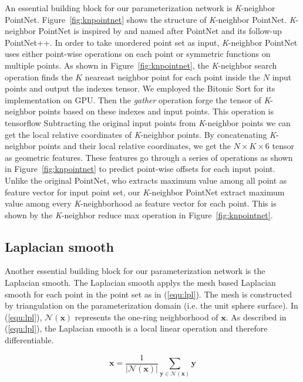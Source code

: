 An essential building block for our parameterization network is \textit{K}-neighbor PointNet. Figure~\ref{fig:knpointnet} shows the structure of \textit{K}-neighbor PointNet. \textit{K}-neighbor PointNet is inspired by and named after PointNet\citep{PointNet} and its follow-up PointNet++\citep{NIPS2017_7095}. In order to take unordered point set as input, \textit{K}-neighbor PointNet uses either point-wise operations on each point or symmetric functions on multiple points. As shown in Figure~\ref{fig:knpointnet}, the \textit{K}-neighbor search operation finds the $K$ neareast neighbor point for each point inside the $N$ input points and output the indexes tensor. We employed the Bitonic Sort\citep{bitonicsorter} for its implementation on GPU. Then the  \emph{gather} operation forge the tensor of \textit{K}-neighbor points based on these indexes and input points. This operation is tensorflow  Subtracting the original input points from \textit{K}-neighbor points we can get the local relative coordinates of \textit{K}-neighbor points. By concatenating \textit{K}-neighbor points and their local relative coordinates, we get the $N\times K\times6$ tensor as geometric features. These features go through a series of operations as shown in Figure~\ref{fig:knpointnet} to predict point-wise offsets for each input point. Unlike the original PointNet\citep{PointNet}, who extracts maximum value among all point as feature vector for input point set, our \textit{K}-neighbor PointNet extract maximum value among every \textit{K}-neighborhood as feature vector for each point. This is shown by the \textit{K}-neighbor reduce max operation in Figure~\ref{fig:knpointnet}.

\subsection{Laplacian smooth}
Another essential building block for our parameterization network is the Laplacian smooth. The Laplacian smooth applys the mesh based Laplacian smooth for each point in the point set as in (\ref{equ:lpl}). The mesh is constructed by triangulation on the parameterization domain (i.e. the unit sphere surface). In (\ref{equ:lpl}), $\mathcal{N}(\mathbf{x})$ represents the one-ring neighborhood of $\mathbf{x}$. As described in (\ref{equ:lpl}), the Laplacian smooth is a local linear operation and therefore differentiable.

\begin{equation}
\mathbf{x} = \frac{1}{|\mathcal{N}(\mathbf{x})|}\sum_{\mathbf{y}\in\mathcal{N}(\mathbf{x})}\mathbf{y}
\label{equ:lpl}
\end{equation}

